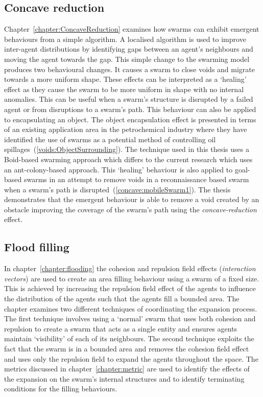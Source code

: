 \subsection{Concave reduction}
Chapter~\ref{chapter:ConcaveReduction} examines how swarms can exhibit emergent behaviours from a simple algorithm. A localised algorithm is used to improve inter-agent distributions by identifying gaps between an agent's neighbours and moving the agent towards the gap. This simple change to the swarming model produces two behavioural changes. It causes a swarm to close voids and migrate towards a more uniform shape. These effects can be interpreted as a `healing' effect as they cause the swarm to be more uniform in shape with no internal anomalies. This can be useful when a swarm's structure is disrupted by a failed agent or from disruptions to a swarm's path. This behaviour can also be applied to encapsulating an object. The object encapsulation effect is presented in terms of an existing application area in the petrochemical industry where they have identified the use of swarms as a potential method of controlling oil spillages~(\autoref{voids:ObjectSurrounding}). The technique used in this thesis uses a Boid-based swarming approach which differs to the current research which uses an ant-colony-based approach. This `healing' behaviour is also applied to goal-based swarms in an attempt to remove voids in a reconnaissance based swarm when a swarm's path is disrupted~(\autoref{concave:mobileSwarm1}). The thesis demonstrates that the emergent behaviour is able to remove a void created by an obstacle improving the coverage of the swarm's path using the \textit{concave-reduction} effect.

\subsection{Flood filling}
In chapter~\ref{chapter:flooding} the cohesion and repulsion field effects (\textit{interaction vectors}) are used to create an area filling behaviour using a swarm of a fixed size. This is achieved by increasing the repulsion field effect of the agents to influence the distribution of the agents such that the agents fill a bounded area. The chapter examines two different techniques of coordinating the expansion process. The first technique involves using a `normal' swarm that uses both cohesion and repulsion to create a swarm that acts as a single entity and ensures agents maintain `visibility' of each of its neighbours. The second technique exploits the fact that the swarm is in a bounded area and removes the cohesion field effect and uses only the repulsion field to expand the agents throughout the space. The metrics discussed in chapter~\ref{chapter:metric} are used to identify the effects of the expansion on the swarm's internal structures and to identify terminating conditions for the filling behaviours.

